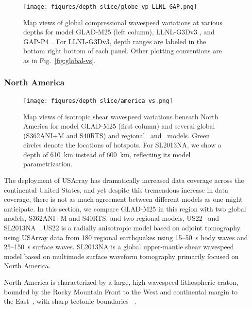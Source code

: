 \documentclass[extra,mreferee]{gji}
\begin{document}
\begin{figure}
\texttt{[image: figures/depth\_slice/globe\_vp\_LLNL-GAP.png]}
  \caption{\small{Map views of global compressional wavespeed variations at various depths for model
  GLAD-M25 (left column), LLNL-G3Dv3 \citep[middle column;][]{simmons2012llnl}, and
  GAP-P4~\citep[right column;][]{fukao2013subducted}.
  For LLNL-G3Dv3, depth ranges are labeled in the bottom right
  bottom of each panel. Other plotting conventions are as in Fig.~\ref{fig:global-vs}.}}
\label{fig:global-vp}
\centering
\end{figure}

\subsubsection{North America}

\begin{figure}
\centering
\texttt{[image: figures/depth\_slice/america\_vs.png]}
  \caption{\small{Map views of isotropic shear wavespeed variations beneath North America 
  for model GLAD-M25 (first column) and several global (S362ANI$+$M and S40RTS)
  and regional~\citep[US22;][]{zhu2017radial} and~\citep[SL2013NA;][]{schaeffer2014imaging}
  models. Green circles denote the locations of hotspots. For SL2013NA, we
  show a depth of 610~km instead of 600~km, reflecting its model parametrization.}}
\label{fig:america-vs}
\end{figure}

The deployment of USArray has dramatically increased data coverage across the
continental United States,
and yet despite this tremendous increase in data coverage, there is not as much agreement between different models as one might anticipate.
In this section, we compare GLAD-M25 in this region 
with two global models, S362ANI$+$M and S40RTS, and two regional models,
US22~\citep{zhu2017radial} and SL2013NA~\citep{schaeffer2014imaging}.
US22 is a radially anisotropic model based on adjoint tomography using
USArray data from 180 regional earthquakes using 15--50~s
body waves and 25--150~s surface waves.
SL2013NA is a global upper-mantle shear wavespeed model based on multimode
surface waveform tomography primarily focused on North America.

North America is characterized by a large, high-wavespeed lithospheric craton,
bounded by the Rocky Mountain Front to the West and continental
margin to the East~\citep{grand1984upper, whitmeyer2007tectonic},
with sharp tectonic boundaries
~\citep{masters1996shear, grand1997high, megnin2000three, gu2001models}.
\end{document}
